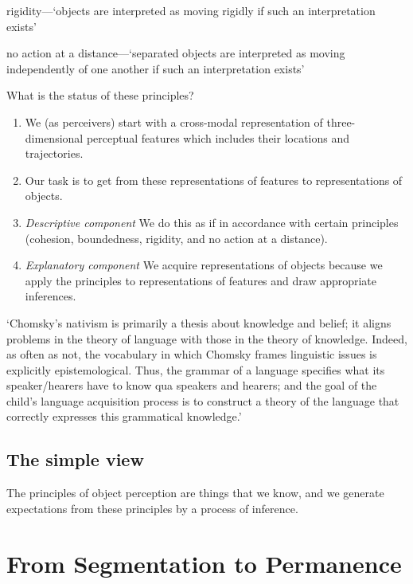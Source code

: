 \documentclass[12pt]{extarticle}
\begin{document}
\begin{multicols}{3}
rigidity—‘objects are interpreted as moving rigidly if such an interpretation exists’
 
no action at a distance—‘separated objects are interpreted as moving independently of one another if such an interpretation exists’

\vfill
\columnbreak
 
What is the status of these principles?
\begin{enumerate}
\item We (as perceivers) start with a cross-modal representation of three-dimensional perceptual features which includes their locations and trajectories.

\item Our task is to get from these representations of features to representations of objects.

\item \emph{Descriptive component} We do this as if in accordance with certain principles (cohesion, boundedness, rigidity, and no action at a distance).

\item \emph{Explanatory component} We acquire representations of objects because we apply the principles to representations of features and draw appropriate inferences.

\end{enumerate}

 
‘Chomsky’s nativism is primarily a thesis about knowledge and belief; it aligns problems in the theory of language with those in the theory of knowledge. Indeed, as often as not, the vocabulary in which Chomsky frames linguistic issues is explicitly epistemological. Thus, the grammar of a language specifies what its speaker/hearers have to know qua speakers and hearers; and the goal of the child’s language acquisition process is to construct a theory of the language that correctly expresses this grammatical knowledge.’
\citep[p.\ 11]{Fodor:2000cj}
 
\subsection{The simple view}
 
The principles of object perception are things that we know, and we generate expectations from these principles by a process of inference.
 
 
 
\section{From Segmentation to Permanence}
 

\end{multicols}
\end{document}

